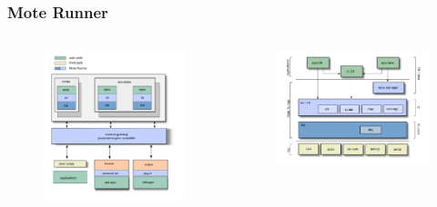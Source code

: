 \begin{frame}[fragile]
  \frametitle{Mote Runner}
  \begin{columns}
    \begin{column}{.5\linewidth}
    	\begin{figure}
	  \centering
	  \includegraphics[width=\textwidth]{img/overview.jpg}
    	\end{figure}
    \end{column}
    \hfill
    \begin{column}{.5\linewidth}
    	\begin{figure}
	  \centering
	  \includegraphics[width=\textwidth]{img/onmote.jpg}
    	\end{figure}
    \end{column}
  \end{columns}
\end{frame}

